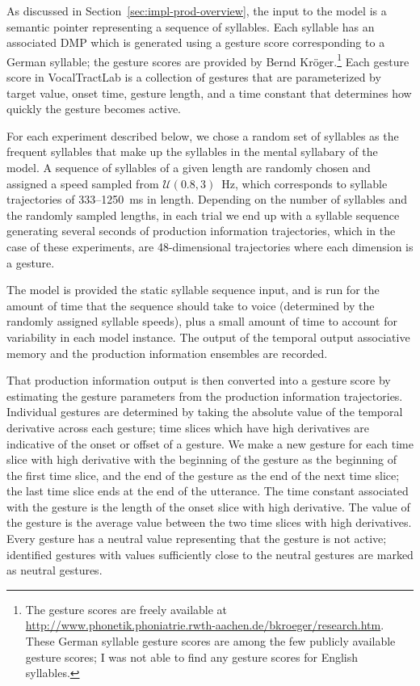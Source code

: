 As discussed in Section~\ref{sec:impl-prod-overview},
the input to the model
is a semantic pointer
representing a sequence of syllables.
Each syllable has an associated DMP
which is generated using
a gesture score corresponding to
a German syllable;
the gesture scores are provided by
Bernd Kr\"{o}ger.\footnote{
  The gesture scores are freely available at
  \url{http://www.phonetik.phoniatrie.rwth-aachen.de/bkroeger/research.htm}.
  These German syllable gesture scores are among
  the few publicly available gesture scores;
  I was not able to find any gesture scores
  for English syllables.}
Each gesture score in VocalTractLab
is a collection of
gestures that are parameterized by target value,
onset time, gesture length,
and a time constant that determines
how quickly the gesture becomes active.

For each experiment described below,
we chose a random set of syllables
as the frequent syllables
that make up the syllables
in the mental syllabary of the model.
A sequence of syllables of a given length
are randomly chosen and assigned a speed
sampled from $\mathcal{U}(0.8, 3)$~Hz,
which corresponds to syllable trajectories of
333--1250~ms in length.
Depending on the number of syllables
and the randomly sampled lengths,
in each trial we end up with a syllable sequence
generating several seconds
of production information trajectories,
which in the case of these experiments,
are 48-dimensional trajectories
where each dimension is a gesture.

The model is provided the static syllable sequence input,
and is run for the amount of time that the sequence
should take to voice (determined by the
randomly assigned syllable speeds),
plus a small amount of time to account
for variability in each model instance.
The output of the temporal output associative memory
and the production information ensembles
are recorded.

That production information output is then converted
into a gesture score
by estimating the gesture parameters
from the production information trajectories.
Individual gestures are determined by
taking the absolute value of the temporal derivative
across each gesture;
time slices which have high derivatives
are indicative of the onset or offset of a gesture.
We make a new gesture for each
time slice with high derivative
with the beginning of the gesture as
the beginning of the first time slice,
and the end of the gesture
as the end of the next time slice;
the last time slice ends at the end
of the utterance.
The time constant associated
with the gesture
is the length of
the onset slice with high derivative.
The value of the gesture is the
average value between the two
time slices with high derivatives.
Every gesture has a neutral value
representing that the gesture
is not active;
identified gestures with values
sufficiently close to the neutral gestures
are marked as neutral gestures.

